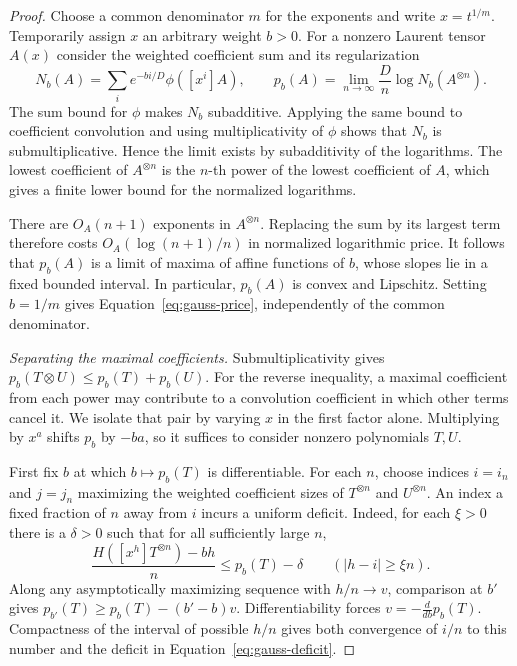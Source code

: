 \begin{proof}
Choose a common denominator $m$ for the exponents and write
$x=t^{1/m}$. Temporarily assign $x$ an arbitrary weight $b>0$. For
a nonzero Laurent tensor $A(x)$ consider the weighted coefficient sum
and its regularization
\[
 N_b(A)=\sum_i e^{-bi/D}\phi([x^i]A),
 \qquad
 p_b(A)=\lim_{n\to\infty}\frac Dn\log N_b(A^{\otimes n}).
\]
The sum bound for $\phi$ makes $N_b$ subadditive. Applying the same
bound to coefficient convolution and using multiplicativity of $\phi$
shows that $N_b$ is submultiplicative. Hence the limit exists by
subadditivity of the logarithms. The lowest coefficient of
$A^{\otimes n}$ is the $n$-th power of the lowest coefficient of $A$,
which gives a finite lower bound for the normalized logarithms.

There are $O_A(n+1)$ exponents in $A^{\otimes n}$. Replacing the sum
by its largest term therefore costs $O_A(\log(n+1)/n)$ in normalized
logarithmic price. It follows that $p_b(A)$ is a limit of maxima of
affine functions of $b$, whose slopes lie in a fixed bounded
interval. In particular, $p_b(A)$ is convex and Lipschitz. Setting
$b=1/m$ gives Equation~\eqref{eq:gauss-price}, independently of the
common denominator.

\smallskip\noindent\emph{Separating the maximal coefficients.}
Submultiplicativity gives $p_b(T\otimes U)\le p_b(T)+p_b(U)$.
For the reverse inequality, a maximal coefficient from each power
may contribute to a convolution coefficient in which other terms
cancel it. We isolate that pair by varying $x$ in the first factor
alone. Multiplying by $x^a$ shifts $p_b$ by $-ba$, so it suffices to
consider nonzero polynomials $T,U$.

First fix $b$ at which $b\mapsto p_b(T)$ is differentiable. For each
$n$, choose indices $i=i_n$ and $j=j_n$ maximizing the weighted
coefficient sizes of $T^{\otimes n}$ and $U^{\otimes n}$. An index
a fixed fraction of $n$ away from $i$ incurs a uniform deficit.
Indeed, for each $\xi>0$ there is a $\delta>0$ such that for all
sufficiently large $n$,
\begin{equation}\label{eq:gauss-deficit}
 \frac{H([x^h]T^{\otimes n})-bh}{n}
   \le p_b(T)-\delta \qquad (|h-i|\ge \xi n).
\end{equation}
Along any asymptotically maximizing sequence with $h/n\to v$,
comparison at $b'$ gives $p_{b'}(T)\ge p_b(T)-(b'-b)v$.
Differentiability forces $v=-\frac{d}{db}p_b(T)$. Compactness of the
interval of possible $h/n$ gives both convergence of $i/n$ to this
number and the deficit in Equation~\eqref{eq:gauss-deficit}.


\end{proof}
